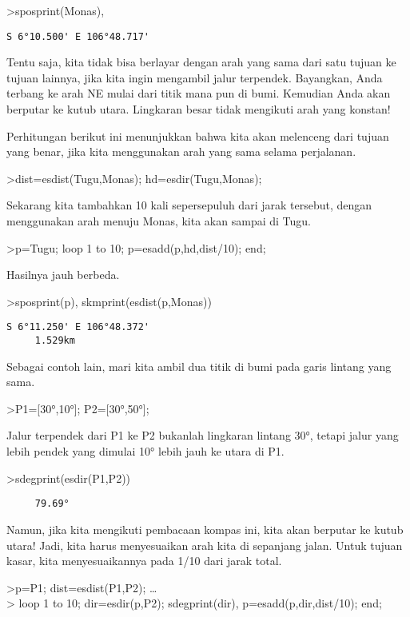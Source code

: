 \documentclass[
]{book}
\begin{document}
\textgreater sposprint(Monas),

\begin{verbatim}
S 6°10.500' E 106°48.717'
\end{verbatim}

Tentu saja, kita tidak bisa berlayar dengan arah yang sama dari satu tujuan ke tujuan lainnya, jika kita ingin mengambil jalur terpendek. Bayangkan, Anda terbang ke arah NE mulai dari titik mana pun di bumi. Kemudian Anda akan berputar ke kutub utara. Lingkaran besar tidak mengikuti arah yang konstan!

Perhitungan berikut ini menunjukkan bahwa kita akan melenceng dari tujuan yang benar, jika kita menggunakan arah yang sama selama perjalanan.

\textgreater dist=esdist(Tugu,Monas); hd=esdir(Tugu,Monas);

Sekarang kita tambahkan 10 kali sepersepuluh dari jarak tersebut, dengan menggunakan arah menuju Monas, kita akan sampai di Tugu.

\textgreater p=Tugu; loop 1 to 10; p=esadd(p,hd,dist/10); end;

Hasilnya jauh berbeda.

\textgreater sposprint(p), skmprint(esdist(p,Monas))

\begin{verbatim}
S 6°11.250' E 106°48.372'
     1.529km
\end{verbatim}

Sebagai contoh lain, mari kita ambil dua titik di bumi pada garis lintang yang sama.

\textgreater P1={[}30°,10°{]}; P2={[}30°,50°{]};

Jalur terpendek dari P1 ke P2 bukanlah lingkaran lintang 30°, tetapi jalur yang lebih pendek yang dimulai 10° lebih jauh ke utara di P1.

\textgreater sdegprint(esdir(P1,P2))

\begin{verbatim}
     79.69°
\end{verbatim}

Namun, jika kita mengikuti pembacaan kompas ini, kita akan berputar ke kutub utara! Jadi, kita harus menyesuaikan arah kita di sepanjang jalan. Untuk tujuan kasar, kita menyesuaikannya pada 1/10 dari jarak total.

\textgreater p=P1; dist=esdist(P1,P2); \ldots{}\\
\textgreater{} loop 1 to 10; dir=esdir(p,P2); sdegprint(dir), p=esadd(p,dir,dist/10); end;
\end{document}
